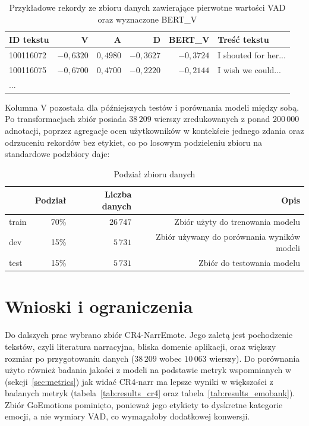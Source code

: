 \begin{table}[htbp]
  \centering
  \caption{Przykładowe rekordy ze zbioru danych zawierające pierwotne wartości VAD oraz wyznaczone BERT\_V}
  \label{tab:vad_bert_v_sample}
  \begin{tabular}{lrrrrl}
    \toprule
    \textbf{ID tekstu} & \textbf{V} & \textbf{A} & \textbf{D} & \textbf{BERT\_V} & \textbf{Treść tekstu} \\
    \midrule
    100116072 & $-0,6320$ & $0,4980$ & $-0,3627$ & $-0,3724$ & I shouted for her... \\
    \midrule
    100116075 & $-0,6700$ & $0,4700$ & $-0,2220$ & $-0,2144$ & I wish we could... \\
    \midrule
    ...\\
    \bottomrule
  \end{tabular}
\end{table}
Kolumna V pozostała dla późniejszych testów i porównania modeli między sobą. Po transformacjach
zbiór posiada $38\,209$ wierszy zredukowanych z ponad $200\,000$ adnotacji, poprzez agregacje ocen użytkowników w kontekście jednego zdania oraz odrzuceniu rekordów bez etykiet, co po losowym
podzieleniu zbioru na standardowe podzbiory daje:
\begin{table}[htbp]
  \centering
  \caption{Podział zbioru danych}
  \label{tab:train_dev_test}
  \begin{tabular}{lrrr}
    \toprule
    & \textbf{Podział} & \textbf{Liczba danych} & \textbf{Opis} \\
    \midrule
    train & 70\% & $26\,747$ & Zbiór użyty do trenowania modelu\\
    \midrule
    dev & 15\% & $5\,731$ & Zbiór używany do porównania wyników modeli\\
    \midrule
    test & 15\% & $5\,731$ & Zbiór do testowania modelu\\
    \bottomrule
  \end{tabular}
\end{table}

\section{Wnioski i ograniczenia}
Do dalszych prac wybrano zbiór CR4-NarrEmote. Jego zaletą jest pochodzenie
tekstów, czyli literatura narracyjna, bliska domenie aplikacji, oraz większy
rozmiar po przygotowaniu danych ($38\,209$ wobec $10\,063$ wierszy). Do porównania użyto również
badania jakości z modeli na podstawie metryk wspomnianych w (sekcji~\ref{sec:metrics}) jak widać
CR4-narr ma lepsze wyniki w większości z badanych metryk (tabela~\ref{tab:results_cr4} oraz 
tabela~\ref{tab:results_emobank}). Zbiór GoEmotions pominięto, ponieważ jego etykiety to dyskretne
kategorie emocji, a nie wymiary VAD, co wymagałoby dodatkowej konwersji.


